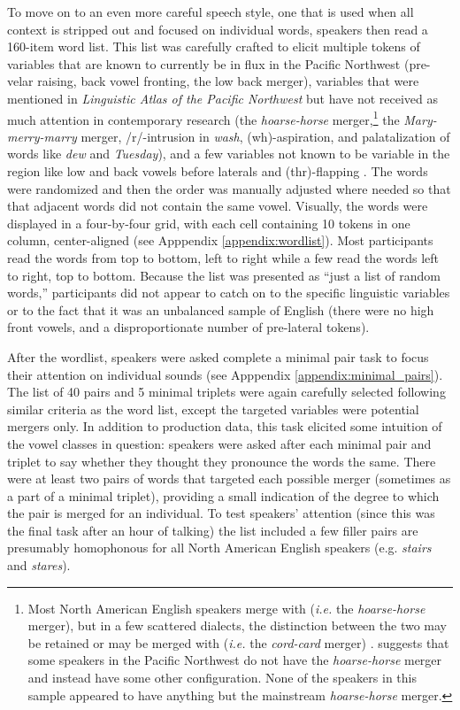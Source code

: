 To move on to an even more careful speech style, one that is used when all context is stripped out and focused on individual words, speakers then read a 160-item word list. This list was carefully crafted to elicit multiple tokens of variables that are known to currently be in flux in the Pacific Northwest (pre-velar raising, back vowel fronting, the low back merger), variables that were mentioned in \textit{Linguistic Atlas of the Pacific Northwest} but have not received as much attention in contemporary research (the \textit{hoarse-horse} merger,\footnote{Most North American English speakers merge \north with \force (\textit{i.e.} the \textit{hoarse-horse} merger), but in a few scattered dialects, the distinction between the two may be retained or \north may be merged with \start (\textit{i.e.} the \textit{cord-card} merger) \citep{labov_ash_boberg_2006_anae}. \citet[560]{reed_1961} suggests that some speakers in the Pacific Northwest do not have the \textit{hoarse-horse} merger and instead have some other configuration. None of the speakers in this sample appeared to have anything but the mainstream \textit{hoarse-horse} merger.} the \textit{Mary-merry-marry} merger, /r/-intrusion in \textit{wash}, (wh)-aspiration, and palatalization of words like \textit{dew} and \textit{Tuesday}), and a few variables not known to be variable in the region like low and back vowels before laterals \citep[cf.][]{stanley_2017_ADS} and (thr)-flapping \citep[cf.][]{stanley_2018_thr}. The words were randomized and then the order was manually adjusted where needed so that that adjacent words did not contain the same vowel. Visually, the words were displayed in a four-by-four grid, with each cell containing 10 tokens in one column, center-aligned (see Apppendix \ref{appendix:wordlist}). Most participants read the words from top to bottom, left to right while a few read the words left to right, top to bottom. Because the list was presented as ``just a list of random words,'' participants did not appear to catch on to the specific linguistic variables or to the fact that it was an unbalanced sample of English (there were no high front vowels, and a disproportionate number of pre-lateral tokens).

After the wordlist, speakers were asked complete a minimal pair task to focus their attention on individual sounds (see Apppendix \ref{appendix:minimal_pairs}). The list of 40 pairs and 5 minimal triplets were again carefully selected following similar criteria as the word list, except the targeted variables were potential mergers only. In addition to production data, this task elicited some intuition of the vowel classes in question: speakers were asked after each minimal pair and triplet to say whether they thought they pronounce the words the same. There were at least two pairs of words that targeted each possible merger (sometimes as a part of a minimal triplet), providing a small indication of the degree to which the pair is merged for an individual. To test speakers’ attention (since this was the final task after an hour of talking) the list included a few filler pairs are presumably homophonous for all North American English speakers (e.g. \textit{stairs} and \textit{stares}).

